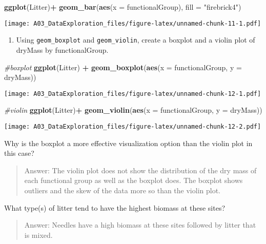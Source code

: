 \documentclass[]{article}
\newenvironment{Shaded}{\begin{snugshade}}{\end{snugshade}}
\newcommand{\CommentTok}[1]{\textcolor[rgb]{0.56,0.35,0.01}{\textit{#1}}}
\newcommand{\DataTypeTok}[1]{\textcolor[rgb]{0.13,0.29,0.53}{#1}}
\newcommand{\KeywordTok}[1]{\textcolor[rgb]{0.13,0.29,0.53}{\textbf{#1}}}
\newcommand{\NormalTok}[1]{#1}
\newcommand{\OperatorTok}[1]{\textcolor[rgb]{0.81,0.36,0.00}{\textbf{#1}}}
\newcommand{\StringTok}[1]{\textcolor[rgb]{0.31,0.60,0.02}{#1}}
\providecommand{\tightlist}{%
  \setlength{\itemsep}{0pt}\setlength{\parskip}{0pt}}
\begin{document}
\begin{Shaded}
\begin{Highlighting}[]
\KeywordTok{ggplot}\NormalTok{(Litter)}\OperatorTok{+}
\StringTok{  }\KeywordTok{geom_bar}\NormalTok{(}\KeywordTok{aes}\NormalTok{(}\DataTypeTok{x =}\NormalTok{ functionalGroup), }\DataTypeTok{fill =} \StringTok{"firebrick4"}\NormalTok{)}
\end{Highlighting}
\end{Shaded}

\texttt{[image: A03\_DataExploration\_files/figure-latex/unnamed-chunk-11-1.pdf]}

\begin{enumerate}
\def\labelenumi{\arabic{enumi}.}
\setcounter{enumi}{14}
\tightlist
\item
  Using \texttt{geom\_boxplot} and \texttt{geom\_violin}, create a
  boxplot and a violin plot of dryMass by functionalGroup.
\end{enumerate}

\begin{Shaded}
\begin{Highlighting}[]
\CommentTok{#boxplot }
\KeywordTok{ggplot}\NormalTok{(Litter) }\OperatorTok{+}
\StringTok{  }\KeywordTok{geom_boxplot}\NormalTok{(}\KeywordTok{aes}\NormalTok{(}\DataTypeTok{x =}\NormalTok{ functionalGroup, }\DataTypeTok{y =}\NormalTok{ dryMass))}
\end{Highlighting}
\end{Shaded}

\texttt{[image: A03\_DataExploration\_files/figure-latex/unnamed-chunk-12-1.pdf]}

\begin{Shaded}
\begin{Highlighting}[]
\CommentTok{#violin }
\KeywordTok{ggplot}\NormalTok{(Litter)}\OperatorTok{+}
\StringTok{  }\KeywordTok{geom_violin}\NormalTok{(}\KeywordTok{aes}\NormalTok{(}\DataTypeTok{x =}\NormalTok{ functionalGroup, }\DataTypeTok{y =}\NormalTok{ dryMass))}
\end{Highlighting}
\end{Shaded}

\texttt{[image: A03\_DataExploration\_files/figure-latex/unnamed-chunk-12-2.pdf]}

Why is the boxplot a more effective visualization option than the violin
plot in this case?

\begin{quote}
Answer: The violin plot does not show the distribution of the dry mass
of each functional group as well as the boxplot does. The boxplot shows
outliers and the skew of the data more so than the violin plot.
\end{quote}

What type(s) of litter tend to have the highest biomass at these sites?

\begin{quote}
Answer: Needles have a high biomass at these sites followed by litter
that is mixed.
\end{quote}
\end{document}

